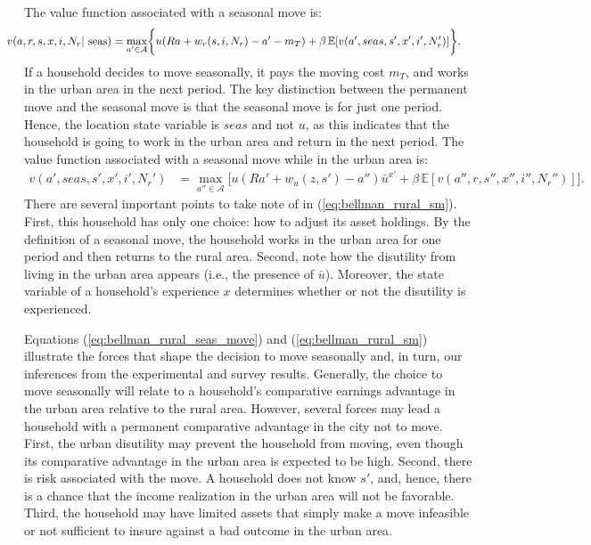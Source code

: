 \documentclass[pdftex,11pt]{article}
\begin{document}
The value function associated with a seasonal move is:
\begin{align}
\hspace{-0.60cm}v(a, r, s, x, i, N_r | \ \mbox{seas}) = \max_{a'\in \mathcal{A}}&\bigg\{ u(Ra + w_r(s, i, N_r) - a' - m_T ) + \beta \, \mathbb{E} [v(a',seas, s', x', i', N_r')] \bigg\}.
\label{eq:bellman_rural_seas_move}
\end{align}
If a household decides to move seasonally, it pays the moving cost $m_T$, and works in the urban area in the next period. The key distinction between the permanent move and the seasonal move is that the seasonal move is for just one period. Hence, the location state variable is $seas$ and not $u$, as this indicates that the household is going to work in the urban area and return in the next period. The value function associated with a seasonal move while in the urban area is:
\begin{align}
v(a',seas, s',x', i',N_r')&=  \max_{a''\in \mathcal{A}}\bigg[ u(Ra' + w_u(z, s') - a'')\bar u^{x'} + \beta \, \mathbb{E} [v(a'',r, s'', x'', i'',N_r'')] \bigg].
\label{eq:bellman_rural_sm}
\end{align}
There are several important points to take note of in (\ref{eq:bellman_rural_sm}). First, this household has only one choice: how to adjust its asset holdings. By the definition of a seasonal move, the household works in the urban area for one period and then returns to the rural area. Second, note how the disutility from living in the urban area appears (i.e., the presence of $\bar u$). Moreover, the state variable of a household's experience $x$ determines whether or not the disutility is experienced.

Equations (\ref{eq:bellman_rural_seas_move}) and (\ref{eq:bellman_rural_sm}) illustrate the forces that shape the decision to move seasonally and, in turn, our inferences from the experimental and survey results. Generally, the choice to move seasonally will relate to a household's comparative earnings advantage in the urban area relative to the rural area. However, several forces may lead a household with a permanent comparative advantage in the city not to move. First, the urban disutility may prevent the household from moving, even though its comparative advantage in the urban area is expected to be high. Second, there is risk associated with the move. A household does not know $s'$, and, hence, there is a chance that the income realization in the urban area will not be favorable. Third, the household may have limited assets that simply make a move infeasible or not sufficient to insure against a bad outcome in the urban area.
\end{document}
